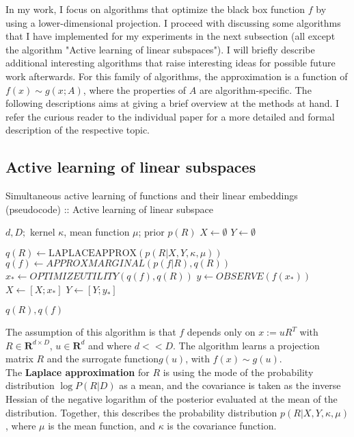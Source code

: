 In my work, I focus on algorithms that optimize the black box function $f$ by using a lower-dimensional projection.
I proceed with discussing some algorithms that I have implemented for my experiments in the next subsection (all except the algorithm "Active learning of linear subspaces").
I will briefly describe additional interesting algorithms that raise interesting ideas for possible future work afterwards.
For this family of algorithms, the approximation is a function of $f(x) \sim g(x; A)$, where the properties of $A$ are algorithm-specific.
The following descriptions aims at giving a brief overview at the methods at hand. 
I refer the curious reader to the individual paper for a more detailed and formal description of the respective topic.

\subsection{Active learning of linear subspaces}

\begin{algorithm}
\caption{Simultaneous active learning of functions and their linear embeddings (pseudocode) :: Active learning of linear subspace \citep{Garnett2013}}

\begin{algorithmic} 
\REQUIRE $d, D;$ kernel $\kappa$, mean function $\mu$; prior $p(R)$ 
\STATE $X \leftarrow \emptyset$
\STATE $Y \leftarrow \emptyset$

\STATE $ q(R) \leftarrow \text{LAPLACEAPPROX}( p(R | X, Y, \kappa, \mu) ) $
\STATE $ q(f) \leftarrow  APPROXMARGINAL( p(f | R), q(R)) $
\STATE $ x_* \leftarrow OPTIMIZEUTILITY( q(f), q(R) )$
\STATE $ y \leftarrow OBSERVE( f( x_* ) ) $
\STATE $ X \leftarrow [X; x_*] $
\STATE $ Y \leftarrow[Y; y_*] $
\ENDWHILE

\RETURN $q(R), q(f)$
\end{algorithmic}

\end{algorithm}

\citep{Garnett2013} The assumption of this algorithm is that $f$ depends only on $ x := uR^T $ with $ R \in \mathbf{R}^{d \times D}$, $ u \in \mathbf{R}^d $ and where $d << D$. 
The algorithm learns a projection matrix $R$ and the surrogate function$g(u)$, with $f(x) \sim g(u) $. \\

The \textbf{Laplace approximation} for $R$ is using the mode of the probability distribution $\log P (R | D) $ as a mean, and the covariance is taken as the inverse Hessian of the negative logarithm of the posterior evaluated at the mean of the distribution.
Together, this describes the probability distribution $p(R|X, Y, \kappa, \mu )$, where $\mu$ is the mean function, and $\kappa$ is the covariance function.\\

